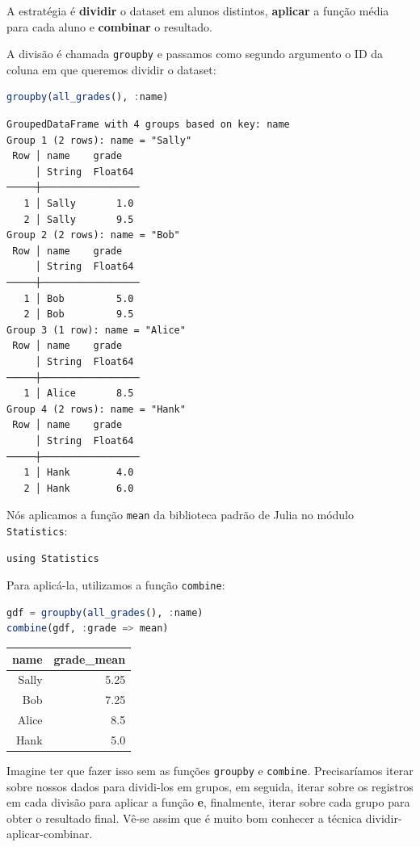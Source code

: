 \documentclass[
  notoc %
]{tufte-book}
\newcommand{\passthrough}[1]{#1}
\begin{document}
A estratégia é \textbf{dividir} o dataset em alunos distintos,
\textbf{aplicar} a função média para cada aluno e \textbf{combinar} o
resultado.

A divisão é chamada \passthrough{\lstinline!groupby!} e passamos como
segundo argumento o ID da coluna em que queremos dividir o dataset:

\begin{lstlisting}[language=Julia]
groupby(all_grades(), :name)
\end{lstlisting}

\begin{lstlisting}
GroupedDataFrame with 4 groups based on key: name
Group 1 (2 rows): name = "Sally"
 Row │ name    grade
     │ String  Float64
─────┼─────────────────
   1 │ Sally       1.0
   2 │ Sally       9.5
Group 2 (2 rows): name = "Bob"
 Row │ name    grade
     │ String  Float64
─────┼─────────────────
   1 │ Bob         5.0
   2 │ Bob         9.5
Group 3 (1 row): name = "Alice"
 Row │ name    grade
     │ String  Float64
─────┼─────────────────
   1 │ Alice       8.5
Group 4 (2 rows): name = "Hank"
 Row │ name    grade
     │ String  Float64
─────┼─────────────────
   1 │ Hank        4.0
   2 │ Hank        6.0
\end{lstlisting}

Nós aplicamos a função \passthrough{\lstinline!mean!} da biblioteca
padrão de Julia no módulo \passthrough{\lstinline!Statistics!}:

\begin{lstlisting}
using Statistics
\end{lstlisting}

Para aplicá-la, utilizamos a função \passthrough{\lstinline!combine!}:

\begin{lstlisting}[language=Julia]
gdf = groupby(all_grades(), :name)
combine(gdf, :grade => mean)
\end{lstlisting}

\begin{longtable}[]{@{}rr@{}}
\toprule
name & grade\_mean \\
\midrule
\endhead
Sally & 5.25 \\
Bob & 7.25 \\
Alice & 8.5 \\
Hank & 5.0 \\
\bottomrule
\end{longtable}

Imagine ter que fazer isso sem as funções
\passthrough{\lstinline!groupby!} e \passthrough{\lstinline!combine!}.
Precisaríamos iterar sobre nossos dados para dividi-los em grupos, em
seguida, iterar sobre os registros em cada divisão para aplicar a função
\textbf{e}, finalmente, iterar sobre cada grupo para obter o resultado
final. Vê-se assim que é muito bom conhecer a técnica
dividir-aplicar-combinar.
\end{document}
